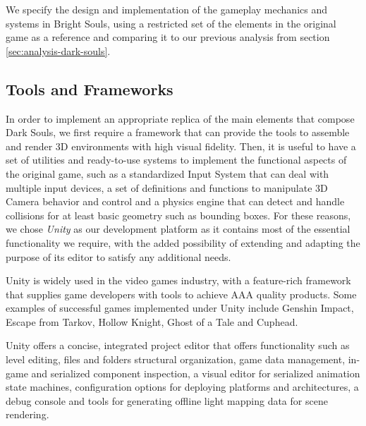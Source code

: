 We specify the design and implementation of the gameplay mechanics and systems in Bright Souls, using a restricted set of the elements in the original game as a reference and comparing it to our previous analysis from section \ref{sec:analysis-dark-souls}.

\subsection{Tools and Frameworks}


In order to implement an appropriate replica of the main elements that compose Dark Souls, we first require a framework that can provide the tools to assemble and render 3D environments with high visual fidelity. Then, it is useful to have a set of utilities and ready-to-use systems to implement the functional aspects of the original game, such as a standardized Input System that can deal with multiple input devices, a set of definitions and functions to manipulate 3D Camera behavior and control and a physics engine that can detect and handle collisions for at least basic geometry such as bounding boxes. For these reasons, we chose \emph{Unity} as our development platform as it contains most of the essential functionality we require, with the added possibility of extending and adapting the purpose of its editor to satisfy any additional needs.


Unity is widely used in the video games industry, with a feature-rich framework that supplies game developers with tools to achieve AAA quality products. Some examples of successful games implemented under Unity include Genshin Impact, Escape from Tarkov, Hollow Knight, Ghost of a Tale and Cuphead.

Unity offers a concise, integrated project editor that offers functionality such as level editing, files and folders structural organization, game data management, in-game and serialized component inspection, a visual editor for serialized animation state machines, configuration options for deploying platforms and architectures, a debug console and tools for generating offline light mapping data for scene rendering.

